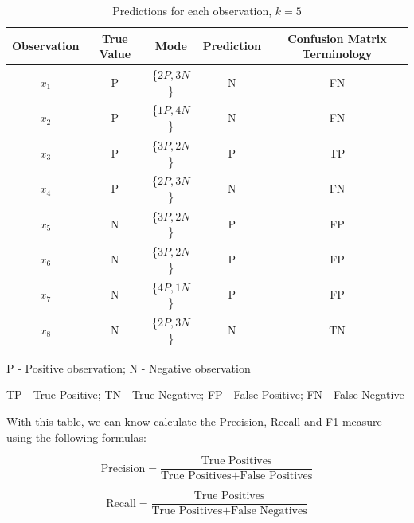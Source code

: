 \documentclass[12pt]{article}
\begin{document}
\begin{enumerate}[leftmargin=\labelsep]
    \begin{table}[H]
        \begin{center}
            \begin{threeparttable}
            \begin{tabular}{c|c|c|c|c}
                Observation & True Value & Mode & Prediction & Confusion Matrix Terminology\\
                \hline
                $x_1$ & P &\{$2P, 3N$\}& N & FN\\
                $x_2$ & P &\{$1P, 4N$\}& N & FN\\
                $x_3$ & P &\{$3P, 2N$\}& P & TP\\
                $x_4$ & P &\{$2P, 3N$\}& N & FN\\
                $x_5$ & N &\{$3P, 2N$\}& P & FP\\
                $x_6$ & N &\{$3P, 2N$\}& P & FP\\
                $x_7$ & N &\{$4P, 1N$\}& P & FP\\
                $x_8$ & N &\{$2P, 3N$\}& N & TN\\
            \end{tabular}
            \begin{tablenotes}
                \small
                \item[]
                \item[P - Positive observation; N - Negative observation]  
                \item[TP - True Positive; TN - True Negative; FP - False Positive; FN - False Negative] 
                \item[] 
            \end{tablenotes}
        \end{threeparttable}
            \caption{Predictions for each observation, $k=5$}
        \end{center}
    \end{table}

    With this table, we can know calculate the Precision, Recall and F1-measure using the following formulas:

    \begin{equation}\label{precision}
        \text{Precision} = \frac{\text{True Positives}}{{\text{True Positives} +
        \text{False Positives}}}
    \end{equation}

    \begin{equation}\label{recall}
        \text{Recall} = \frac{\text{True Positives}}{{\text{True Positives} + \text{False Negatives}}}
    \end{equation}


\end{enumerate}
\end{document}
